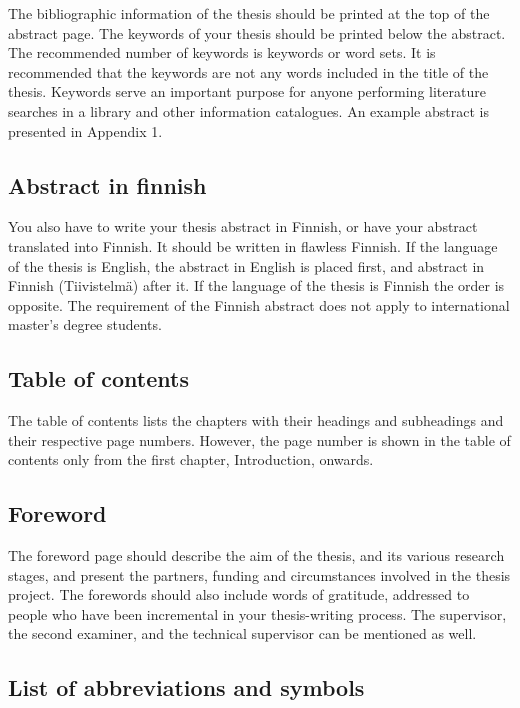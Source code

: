 The bibliographic information of the thesis should be printed at the top of the abstract page. The keywords of your thesis should be printed below the abstract. The recommended number of keywords is \DIFdelbegin {}\DIFdelend \DIFaddbegin {}\DIFaddend keywords or word sets. It is recommended that the keywords are not any words included in the title of the thesis. Keywords serve an important purpose for anyone performing literature searches in a library and other information catalogues. An example abstract is presented in Appendix 1.

\subsection{Abstract in finnish}

You also have to write your thesis abstract in Finnish, or have your abstract translated into Finnish. It should be written in flawless Finnish. If the language of the thesis is English, the abstract in English is placed first, and abstract in Finnish (Tiivistelmä) after it. If the language of the thesis is Finnish the order is opposite. The requirement of the Finnish abstract does not apply to international master’s degree students.

\subsection{Table of contents}

The table of contents lists the chapters with their headings and subheadings and their respective page numbers. However, the page number is shown in the table of contents only from the first chapter, Introduction, onwards.

\subsection{Foreword}

The foreword page should describe the aim of the thesis, and its various research stages, and present the partners, funding and circumstances involved in the thesis project. The forewords should also include words of gratitude, addressed to people who have been incremental in your thesis-writing process. The supervisor, the second examiner, and the technical supervisor can be mentioned as well.

\subsection{List of abbreviations and symbols}

